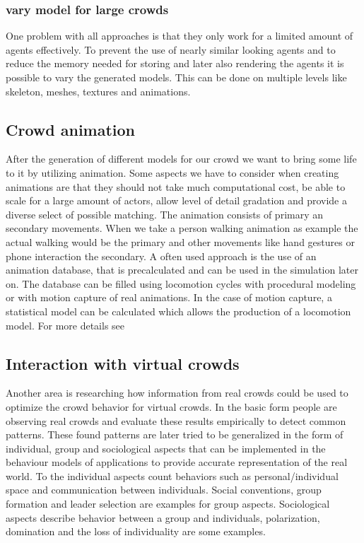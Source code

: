 \documentclass{acmsiggraph}               %
\begin{document}
\subsubsection{vary model for large crowds} 
One problem with all approaches is that they only work for a limited amount of agents effectively. To prevent the use of nearly similar looking agents and to reduce the memory needed for storing and later also rendering the agents it is possible to vary the generated models. This can be done on multiple levels like skeleton, meshes, textures and animations. 
\cite{thalmann_crowd_2013}

\subsection{Crowd animation}

After the generation of different models for our crowd we want to bring some life to it by utilizing animation. Some aspects we have to consider when creating animations are that they should not take much computational cost, be able to scale for a large amount of actors, allow level of detail gradation and provide a diverse select of possible matching. The animation consists of primary an secondary movements. When we take a person walking animation as example the actual walking would be the primary and other movements like hand gestures or phone interaction the secondary.
A often used approach is the use of an animation database, that is precalculated and can be used in the simulation later on. The database can be filled using locomotion cycles with procedural modeling or with motion capture of real animations. In the case of motion capture, a statistical model can be calculated which allows the production of a locomotion model. For more details see \cite{thalmann_crowd_2013}

\subsection{Interaction with virtual crowds}

Another area is researching how information from real crowds could be used to optimize the crowd behavior for virtual crowds. In the basic form people are observing real crowds and evaluate these results empirically to detect common patterns. These found patterns are later tried to be generalized in the form of individual, group and sociological aspects that can be implemented in the behaviour models of applications to provide accurate representation of the real world. To the individual aspects count behaviors such as personal/individual space and communication between individuals. Social conventions, group formation and leader selection are examples for group aspects. Sociological aspects describe behavior between a group and individuals, polarization, domination and the loss of individuality are some examples.  
\end{document}
